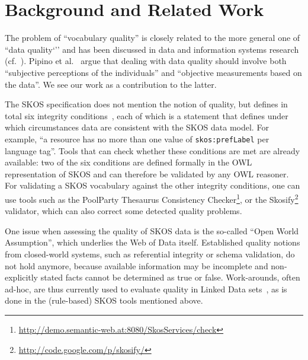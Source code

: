 
\section{Background and Related Work}\label{sec:background}

The problem of ``vocabulary quality'' is closely related to the more general one of ``data quality`'' and has been discussed in data and information systems research (cf.~\cite{Batini2009}). Pipino et al.~\cite{Pipino2002} argue that dealing with data quality should involve both ``subjective perceptions of the individuals'' and ``objective measurements based on the data''. We see our work as a contribution to the latter.

The SKOS specification does not mention the notion of quality, but defines in total six integrity conditions~\cite{SkosReference2008}, each of which is a statement that defines under which circumstances data are consistent with the SKOS data model. For example, ``a resource has no more than one value of \texttt{skos:prefLabel} per language tag''. Tools that can check whether these conditions are met are already available: two of the six conditions are defined formally in the OWL representation of SKOS and can therefore be validated by any OWL reasoner. For validating a SKOS vocabulary against the other integrity conditions, one can use tools such as the PoolParty Thesaurus Consistency Checker\footnote{\url{http://demo.semantic-web.at:8080/SkosServices/check}}, or the Skosify\footnote{\url{http://code.google.com/p/skosify/}} validator, which can also correct some detected quality problems.

One issue when assessing the quality of SKOS data is the so-called ``Open World Assumption'', which underlies the Web of Data itself. Established quality notions from closed-world systems, such as referential integrity or schema validation, do not hold anymore, because available information may be incomplete and non-explicitly stated facts cannot be determined as true or false.  Work-arounds, often ad-hoc, are thus currently used to evaluate quality in Linked Data sets~\cite{Heath2011}, as is done in the (rule-based) SKOS tools mentioned above.



